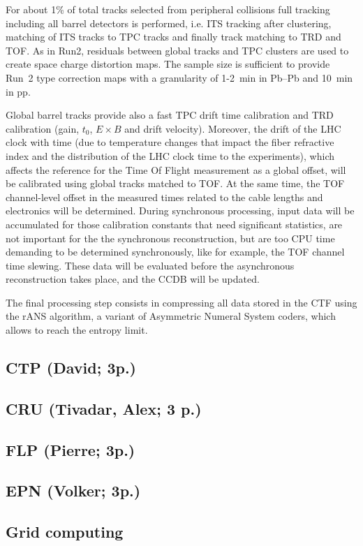 For about 1\% of total tracks selected from peripheral collisions
full tracking including all
barrel detectors is performed, i.e. ITS tracking after clustering,
matching of ITS tracks to TPC tracks
and finally track matching to TRD and TOF. As in Run2, residuals
between
global tracks and TPC clusters are used to create space charge
distortion maps. The sample size is sufficient to provide
Run~2 type correction maps with a granularity of  1-2~min in Pb--Pb and 10~min
in pp.


Global barrel tracks provide also a fast TPC drift
time calibration and TRD calibration (gain, $t_0$, $E \times B$ and drift
velocity). Moreover, the drift of the LHC clock with time (due to temperature
changes that impact the fiber refractive index and the distribution of the LHC clock time to the experiments), which affects the
reference for the Time Of Flight measurement as a global offset,
will be calibrated using global tracks matched to TOF. At the same
time, the TOF channel-level offset in the measured times related to
the cable lengths and electronics will be determined.
During  synchronous processing, input data will be accumulated
for those calibration constants that need significant statistics, are not
important for the the synchronous reconstruction, but are too CPU time demanding to be determined synchronously, like for example, the TOF channel time
slewing. These data will be evaluated before the asynchronous
reconstruction takes place, and the CCDB will be updated.


The final processing step consists in compressing all data stored in the CTF using the rANS algorithm, a variant of
Asymmetric Numeral System coders, which allows to reach the entropy limit.
\subsection{CTP (David; 3p.)}
\subsection{CRU (Tivadar, Alex; 3 p.)}
\subsection{FLP (Pierre; 3p.)}

\subsection{EPN (Volker; 3p.)}
\newpage
\subsection{Grid computing}

